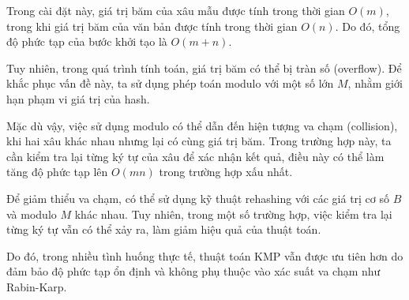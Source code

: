 Trong cài đặt này, giá trị băm của xâu mẫu được tính trong thời gian $O(m)$, trong khi giá trị băm của văn bản được tính trong thời gian $O(n)$. Do đó, tổng độ phức tạp của bước khởi tạo là $O(m + n)$.

Tuy nhiên, trong quá trình tính toán, giá trị băm có thể bị tràn số (overflow). Để khắc phục vấn đề này, ta sử dụng phép toán modulo với một số lớn $M$, nhằm giới hạn phạm vi giá trị của hash.

Mặc dù vậy, việc sử dụng modulo có thể dẫn đến hiện tượng va chạm (collision), khi hai xâu khác nhau nhưng lại có cùng giá trị băm. Trong trường hợp này, ta cần kiểm tra lại từng ký tự của xâu để xác nhận kết quả, điều này có thể làm tăng độ phức tạp lên $O(mn)$ trong trường hợp xấu nhất.

Để giảm thiểu va chạm, có thể sử dụng kỹ thuật rehashing với các giá trị cơ số $B$ và modulo $M$ khác nhau. Tuy nhiên, trong một số trường hợp, việc kiểm tra lại từng ký tự vẫn có thể xảy ra, làm giảm hiệu quả của thuật toán.

Do đó, trong nhiều tình huống thực tế, thuật toán KMP vẫn được ưu tiên hơn do đảm bảo độ phức tạp ổn định và không phụ thuộc vào xác suất va chạm như Rabin-Karp.
